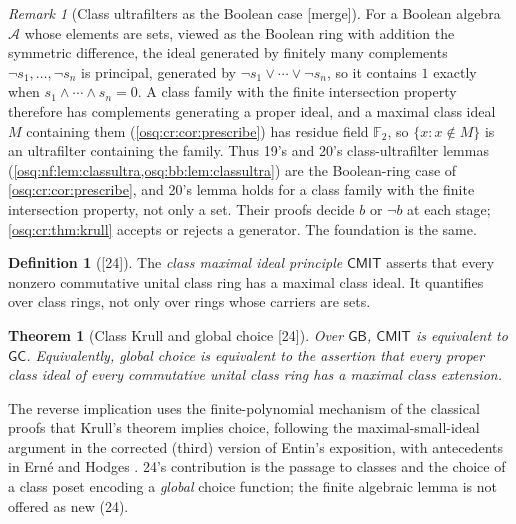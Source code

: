 \documentclass[11pt,letterpaper]{article}
\numberwithin{equation}{section}
\newtheorem{theorem}{Theorem}[section]
\theoremstyle{definition}
\newtheorem{definition}[definition]{Definition}
\theoremstyle{remark}
\newtheorem{remark}[remark]{Remark}
\theoremstyle{plain}
\newcommand{\F}{\mathbb F}
\newcommand{\src}[1]{\textup{\textsf{[#1]}}}
\newcommand{\merge}{\textup{\textsf{[merge]}}}
\begin{document}
\begin{remark}[Class ultrafilters as the Boolean case \merge]\label{osq:cr:rem:ultrafilters}
For a Boolean algebra $\mathcal A$ whose elements are sets, viewed as the Boolean ring with addition the symmetric difference, the ideal generated by
finitely many complements $\neg s_1,\dots,\neg s_n$ is principal, generated by $\neg s_1\vee\cdots\vee\neg s_n$, so it contains $1$ exactly when
$s_1\wedge\cdots\wedge s_n=0$. A class family with the finite intersection property therefore has complements generating a proper ideal, and a
maximal class ideal $M$ containing them (\cref{osq:cr:cor:prescribe}) has residue field $\F_2$, so $\{x:x\notin M\}$ is an ultrafilter containing the
family. Thus 19's and 20's class-ultrafilter lemmas (\cref{osq:nf:lem:classultra,osq:bb:lem:classultra}) are the Boolean-ring case of
\cref{osq:cr:cor:prescribe}, and 20's lemma holds for a class family with the finite intersection property, not only a set. Their proofs decide $b$
or $\neg b$ at each stage; \cref{osq:cr:thm:krull} accepts or rejects a generator. The foundation is the same.
\end{remark}

\begin{definition}[\src{24}]\label{osq:cr:def:cmit}
The \emph{class maximal ideal principle} $\mathsf{CMIT}$ asserts that every nonzero commutative unital class ring has a maximal class ideal. It
quantifies over class rings, not only over rings whose carriers are sets.
\end{definition}

\begin{theorem}[Class Krull and global choice \src{24}]\label{osq:cr:thm:equivalence}
Over $\mathsf{GB}$, $\mathsf{CMIT}$ is equivalent to $\mathsf{GC}$. Equivalently, global choice is equivalent to the assertion that every proper
class ideal of every commutative unital class ring has a maximal class extension.
\end{theorem}

The reverse implication uses the finite-polynomial mechanism of the classical proofs that Krull's theorem implies choice, following the
maximal-small-ideal argument in the corrected (third) version of Entin's exposition, with antecedents in Ern\'e and Hodges
\cite{Entin,Erne,Hodges}. 24's contribution is the passage to classes and the choice of a class poset encoding a \emph{global} choice function;
the finite algebraic lemma is not offered as new (24).
\end{document}
